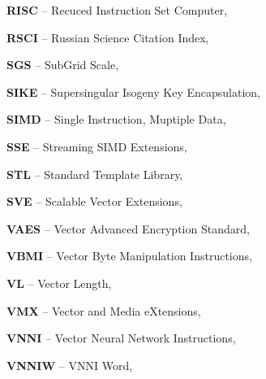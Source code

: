 \textbf{RISC} -- Recuced Instruction Set Computer, \pageref{abbr:risc-1}

\textbf{RSCI} -- Russian Science Citation Index, \pageref{abbr:rsci-1}

\textbf{SGS} -- SubGrid Scale, \pageref{abbr:sgs-1}

\textbf{SIKE} -- Supersingular Isogeny Key Encapsulation, \pageref{abbr:sike-1}

\textbf{SIMD} -- Single Instruction, Muptiple Data, \pageref{abbr:simd-1}

\textbf{SSE} -- Streaming SIMD Extensions, \pageref{abbr:sse-1}

\textbf{STL} -- Standard Template Library, \pageref{abbr:stl-1}

\textbf{SVE} -- Scalable Vector Extensions, \pageref{abbr:sve-1}

\textbf{VAES} -- Vector Advanced Encryption Standard, \pageref{abbr:vaes-1}

\textbf{VBMI} -- Vector Byte Manipulation Instructions, \pageref{abbr:vbmi-1}

\textbf{VL} -- Vector Length, \pageref{abbr:vl-1}

\textbf{VMX} -- Vector and Media eXtensions, \pageref{abbr:vmx-1}

\textbf{VNNI} -- Vector Neural Network Instructions, \pageref{abbr:vnni-1}

\textbf{VNNIW} -- VNNI Word, \pageref{abbr:vnniw-1}

